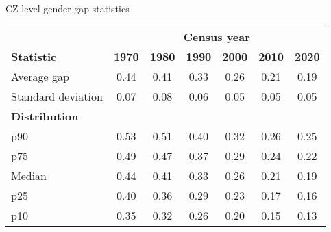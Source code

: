 \begin{center}
\begin{threeparttable}[!h]
\caption{CZ-level gender gap statistics}
\begin{tabular}{lcccccc}
\toprule
\toprule
& \multicolumn{6}{c}{\textbf{Census year}} \\
\cline{2-7}
\textbf{Statistic}&\multicolumn{1}{c}{\textbf{1970}}&\multicolumn{1}{c}{\textbf{1980}}&\multicolumn{1}{c}{\textbf{1990}}&\multicolumn{1}{c}{\textbf{2000}}&\multicolumn{1}{c}{\textbf{2010}}&\multicolumn{1}{c}{\textbf{2020}} \\
\midrule
Average gap         &        0.44         &        0.41         &        0.33         &        0.26         &        0.21         &        0.19         \\
Standard deviation  &        0.07         &        0.08         &        0.06         &        0.05         &        0.05         &        0.05         \\
\midrule\textbf{Distribution} \\
\midrule\hspace{0mm}p90&        0.53         &        0.51         &        0.40         &        0.32         &        0.26         &        0.25         \\
\hspace{0mm}p75     &        0.49         &        0.47         &        0.37         &        0.29         &        0.24         &        0.22         \\
\hspace{0mm}Median  &        0.44         &        0.41         &        0.33         &        0.26         &        0.21         &        0.19         \\
\hspace{0mm}p25     &        0.40         &        0.36         &        0.29         &        0.23         &        0.17         &        0.16         \\
\hspace{0mm}p10     &        0.35         &        0.32         &        0.26         &        0.20         &        0.15         &        0.13         \\
\bottomrule
\bottomrule
\end{tabular}
\end{threeparttable}
\end{center}
